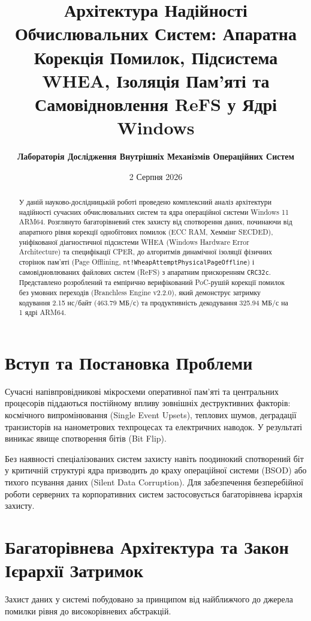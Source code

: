 \documentclass[12pt,a4paper]{article}
\title{\textbf{Архітектура Надійності Обчислювальних Систем: Апаратна Корекція Помилок, Підсистема WHEA, Ізоляція Пам'яті та Самовідновлення ReFS у Ядрі Windows}}
\author{\textbf{Лабораторія Дослідження Внутрішніх Механізмів Операційних Систем}}
\date{2 Серпня 2026}
\begin{document}
\maketitle

\begin{abstract}
У даній науково-дослідницькій роботі проведено комплексний аналіз архітектури надійності сучасних обчислювальних систем та ядра операційної системи Windows 11 ARM64. Розглянуто багаторівневий стек захисту від спотворення даних, починаючи від апаратного рівня корекції однобітових помилок (ECC RAM, Хеммінг SECDED), уніфікованої діагностичної підсистеми WHEA (Windows Hardware Error Architecture) та специфікації CPER, до алгоритмів динамічної ізоляції фізичних сторінок пам'яті (Page Offlining, \texttt{nt!WheapAttemptPhysicalPageOffline}) і самовідновлюваних файлових систем (ReFS) з апаратним прискоренням \texttt{CRC32c}. Представлено розроблений та емпірично верифікований PoC-рушій корекції помилок без умовних переходів (Branchless Engine v2.2.0), який демонструє затримку кодування 2.15 нс/байт (463.79 МБ/с) та продуктивність декодування 325.94 МБ/с на 1 ядрі ARM64.
\end{abstract}

\tableofcontents
\newpage

\section{Вступ та Постановка Проблеми}
Сучасні напівпровідникові мікросхеми оперативної пам'яті та центральних процесорів піддаються постійному впливу зовнішніх деструктивних факторів: космічного випромінювання (Single Event Upsets), теплових шумов, деградації транзисторів на нанометрових техпроцесах та електричних наводок. У результаті виникає явище спотворення бітів (Bit Flip).

Без наявності спеціалізованих систем захисту навіть поодинокий спотворений біт у критичній структурі ядра призводить до краху операційної системи (BSOD) або тихого псування даних (Silent Data Corruption). Для забезпечення безперебійної роботи серверних та корпоративних систем застосовується багаторівнева ієрархія захисту.

\section{Багаторівнева Архітектура та Закон Ієрархії Затримок}

Захист даних у системі побудовано за принципом від найближчого до джерела помилки рівня до високорівневих абстракцій.
\end{document}

